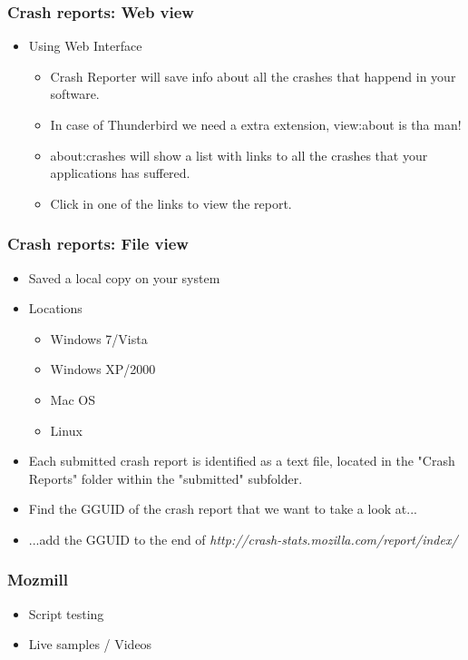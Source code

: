 \documentclass{beamer}
\begin{document}

\begin{frame}
\frametitle{Crash reports: Web view}
 \begin{itemize}
  \item Using Web Interface
     \begin{itemize}
       \item Crash Reporter will save info about all the crashes that happend in your software.
       \item In case of Thunderbird we need a extra extension, view:about is tha man!
       \item about:crashes will show a list with links to all the crashes that your applications has suffered.
       \item Click in one of the links to view the report.
     \end{itemize}
 \end{itemize}
\end{frame}


\begin{frame}
\frametitle{Crash reports: File view}
 \begin{itemize}
  \item Saved a local copy on your system
  \item Locations
    \begin{itemize}
      \item Windows 7/Vista
      \item Windows XP/2000
      \item Mac OS
      \item Linux
    \end{itemize}
  \item Each submitted crash report is identified as a text file, located in the "Crash Reports" folder within the "submitted" subfolder.
  \item Find the GGUID of the crash report that we want to take a look at...
  \item ...add the GGUID to the end of \textit{http://crash-stats.mozilla.com/report/index/}
 \end{itemize}
\end{frame}


\begin{frame}
\frametitle{Mozmill}
 \begin{itemize}
  \item Script testing
  \item Live samples / Videos
 \end{itemize}
\end{frame}
\end{document}

